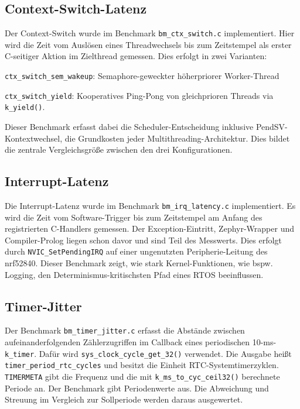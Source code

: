 \subsection{Context-Switch-Latenz}
Der Context-Switch wurde im Benchmark \lstinline[style=codeinline]|bm_ctx_switch.c| implementiert. Hier wird die Zeit vom Ausl{\"o}sen eines Threadwechsels bis zum Zeitstempel als erster C-seitiger Aktion im Zielthread gemessen. Dies erfolgt in zwei Varianten:

\lstinline[style=codeinline]|ctx_switch_sem_wakeup|: Semaphore-geweckter h{\"o}herpriorer Worker-Thread

\lstinline[style=codeinline]|ctx_switch_yield|: Kooperatives Ping-Pong von gleichprioren Threads via \lstinline[style=codeinline]|k_yield()|.

Dieser Benchmark erfasst dabei die Scheduler-Entscheidung inklusive PendSV-Kontextwechsel, die Grundkosten jeder Multithreading-Architektur. Dies bildet die zentrale Vergleichsgr{\"o}{\ss}e zwischen den drei Konfigurationen.

\subsection{Interrupt-Latenz}
Die Interrupt-Latenz wurde im Benchmark \lstinline[style=codeinline]|bm_irq_latency.c| implementiert. Es wird die Zeit vom Software-Trigger bis zum Zeitstempel am Anfang des registrierten C-Handlers gemessen. Der Exception-Eintritt, Zephyr-Wrapper und Compiler-Prolog liegen schon davor und sind Teil des Messwerts. Dies erfolgt durch \lstinline[style=codeinline]|NVIC_SetPendingIRQ| auf einer ungenutzten Peripherie-Leitung des nrf52840. Dieser Benchmark zeigt, wie stark Kernel-Funktionen, wie bspw. Logging, den Determinismus-kritischsten Pfad eines RTOS beeinflussen.

\subsection{Timer-Jitter}
Der Benchmark \lstinline[style=codeinline]|bm_timer_jitter.c| erfasst die Abst{\"a}nde zwischen aufeinanderfolgenden Z{\"a}hlerzugriffen im Callback eines periodischen 10-ms-\lstinline[style=codeinline]|k_timer|. Daf{\"u}r wird \lstinline[style=codeinline]|sys_clock_cycle_get_32()| verwendet. Die Ausgabe hei{\ss}t \lstinline[style=codeinline]|timer_period_rtc_cycles| und besitzt die Einheit RTC-Systemtimerzyklen. \lstinline[style=codeinline]|TIMERMETA| gibt die Frequenz und die mit \lstinline[style=codeinline]|k_ms_to_cyc_ceil32()| berechnete Periode an. Der Benchmark gibt Periodenwerte aus. Die Abweichung und Streuung im Vergleich zur Sollperiode werden daraus ausgewertet.

